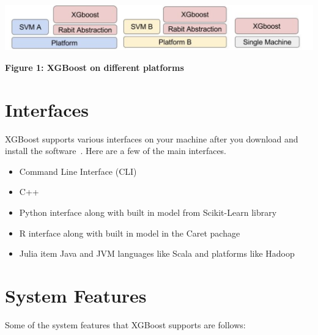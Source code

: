 \begin{center}
\includegraphics[scale=0.3]{images/XGBoost-on-different-platforms.png}
\label{s:XGBoost-on-different-platforms}
\end{center}
\textbf{Figure 1: XGBoost on different platforms
~\cite{hid-sp18-401-XGBoost-on-different-platforms-image}}

\section{Interfaces}

XGBoost supports various interfaces on your machine after you download and
install the software~\cite{hid-sp18-401-XGBoost-MLmastery}. Here are a few 
of the main interfaces.

\begin{itemize}
\item Command Line Interface (CLI)  
\item C++  
\item Python interface along with built in model from Scikit-Learn library   
\item R interface along with built in model in the Caret pachage  
\item Julia item Java and JVM languages like Scala and platforms like Hadoop
\end{itemize}



\section{System Features} 

Some of the system features that XGBoost supports are follows: 

